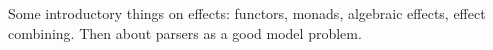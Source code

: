 \Intro

Some introductory things on effects: functors, monads, algebraic effects, effect combining. Then about parsers as a good model problem.
